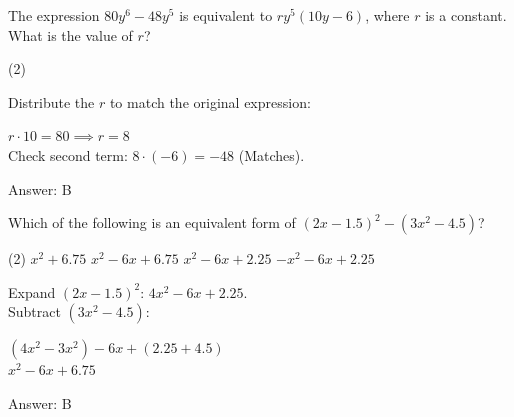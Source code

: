 \documentclass[11pt,paper=a4,answers]{exam}
\begin{document}
\begin{questions}
\vspace{1cm}

\question
The expression $80y^6 - 48y^5$ is equivalent to $ry^5(10y - 6)$, where $r$ is a constant. What is the value of $r$?
\begin{tasks}(2)
       
\end{tasks}

\begin{solution}
Distribute the $r$ to match the original expression:
\vspace{5pt}
\begin{center}
$r \cdot 10 = 80 \implies r = 8$ \\
Check second term: $8 \cdot (-6) = -48$ (Matches).
\end{center}
\vspace{5pt}
Answer: \colorbox{yellow!100}{B}
\end{solution}

\vspace{1cm}

\question
Which of the following is an equivalent form of $(2x - 1.5)^2 - (3x^2 - 4.5)$?
\begin{tasks}(2)
    \task $x^2 + 6.75$
    \task $x^2 - 6x + 6.75$
    \task $x^2 - 6x + 2.25$
    \task $-x^2 - 6x + 2.25$
\end{tasks}

\begin{solution}
Expand $(2x - 1.5)^2$: $4x^2 - 6x + 2.25$. \\
Subtract $(3x^2 - 4.5)$:
\vspace{5pt}
\begin{center}
$(4x^2 - 3x^2) - 6x + (2.25 + 4.5)$ \\
$x^2 - 6x + 6.75$
\end{center}
\vspace{5pt}
Answer: \colorbox{yellow!100}{B}
\end{solution}


\end{questions}
\end{document}

